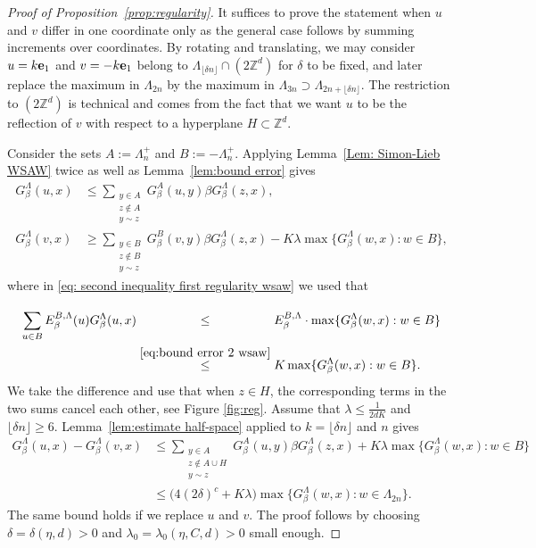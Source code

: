 \documentclass[11pt,a4paper]{article}
\numberwithin{equation}{section}
\theoremstyle{plain}
\theoremstyle{definition}
\begin{document}
\begin{proof}[Proof of Proposition~\textup{\ref{prop:regularity}}]
It suffices to prove the statement when $u$ and $v$ differ in one coordinate only as the general case follows by summing increments over coordinates. By rotating and translating, we may consider $u=k{\bf e}_1$ and $v=-k{\bf e}_1$ belong to $\Lambda_{\lfloor\delta n \rfloor}\cap (2\mathbb Z^d)$ for $\delta$ to be fixed, and later replace the maximum in $\Lambda_{2n}$ by the maximum in $\Lambda_{3n}\supset \Lambda_{2n+\lfloor \delta n\rfloor}$. The restriction to $(2\mathbb Z^d)$ is technical and comes from the fact that we want $u$ to be the reflection of $v$ with respect to a hyperplane $H\subset \mathbb Z^d$.

Consider the sets $A:=\Lambda_n^+$ and $B:=-\Lambda_n^+$. Applying Lemma~\ref{Lem: Simon-Lieb WSAW} twice as well as Lemma~\ref{lem:bound error} gives
\begin{align}
G_\beta^\Lambda(u,x)&\le \sum_{\substack{y \in A\\ z\notin A\\ y\sim z}}G_\beta^A(u,y)\beta G_\beta^\Lambda(z,x),\\
G_\beta^\Lambda(v,x)&\ge \sum_{\substack{y \in B\\ z\notin B\\ y\sim z}}G_\beta^B(v,y)\beta G_\beta^\Lambda(z,x) -K\lambda\max\{G_\beta^\Lambda(w,x):w\in B\}\label{eq: second inequality first regularity wsaw},
\end{align}
where in \eqref{eq: second inequality first regularity wsaw} we used that 
\begin{align}
	\sum_{u\in B}E^{B,\Lambda}_\beta(u)G_\beta^{\Lambda}(u,x)&\stackrel{\phantom{\eqref{eq:bound error 2 wsaw}}}\leq E_\beta^{B,\Lambda}\cdot\max\{G_\beta^{\Lambda}(w,x):w\in B\}\\&\stackrel{\eqref{eq:bound error 2 wsaw}}\leq K \max\{G_\beta^{\Lambda}(w,x):w\in B\}.
\end{align}
We take the difference and use that when $z\in H$, the corresponding terms in the two sums cancel each other, see Figure \ref{fig:reg}. Assume that $\lambda\leq \tfrac{1}{2dK}$ and $\lfloor \delta n\rfloor\geq 6$. Lemma~\ref{lem:estimate half-space} applied to $k=\lfloor \delta n\rfloor$ and $n$ gives \begin{align}
G_\beta^\Lambda(u,x)-G_\beta^\Lambda(v,x)&\le \sum_{\substack{y \in A\\ z\notin A\cup H\\ y\sim z}}G_\beta^{A}(u,y)\beta G_\beta^\Lambda(z,x)+K\lambda \max\{G_\beta^\Lambda(w,x):w\in B\}\\
&\le \Big(4(2\delta)^c+K\lambda\Big)\max\{G_\beta^\Lambda(w,x):w\in\Lambda_{2n}\}.
\end{align}
The same bound holds if we replace $u$ and $v$. The proof follows by choosing $\delta=\delta(\eta,d)>0$ and $\lambda_0=\lambda_0(\eta,C,d)>0$ small enough. \end{proof}
\end{document}
